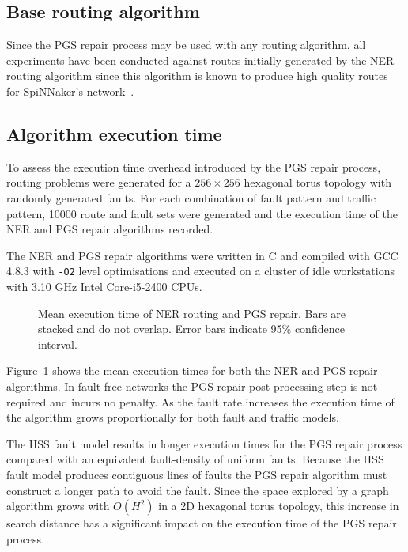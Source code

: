 		\subsection{Base routing algorithm}
			
			Since the PGS repair process may be used with any routing algorithm, all
			experiments have been conducted against routes initially generated by the
			NER routing algorithm since this algorithm is known to produce high
			quality routes for SpiNNaker's network~\cite{navaridas14}.
			
		\subsection{Algorithm execution time}
			
			To assess the execution time overhead introduced by the PGS repair
			process, routing problems were generated for a $256\times256$ hexagonal
			torus topology with randomly generated faults. For each combination of
			fault pattern and traffic pattern, \num{10000} route and fault sets were
			generated and the execution time of the NER and PGS repair algorithms
			recorded.
			
			The NER and PGS repair algorithms were written in C and compiled with GCC
			4.8.3 with \verb|-O2| level optimisations and executed on a cluster of
			idle workstations with 3.10 GHz Intel Core-i5-2400 CPUs.
			
			\begin{figure}
				\center
				
				\caption[Mean execution time of NER routing and PGS repair.]%
				{Mean execution time of NER routing and PGS repair. Bars are stacked
				and do not overlap. Error bars indicate 95\% confidence interval.}
				\label{fig:routing-runtimes}
			\end{figure}
			
			Figure~\ref{fig:routing-runtimes} shows the mean execution times for both
			the NER and PGS repair algorithms. In fault-free networks the PGS repair
			post-processing step is not required and incurs no penalty. As the fault
			rate increases the execution time of the algorithm grows proportionally
			for both fault and traffic models.
			
			The HSS fault model results in longer execution times for the PGS repair
			process compared with an equivalent fault-density of uniform faults.
			Because the HSS fault model produces contiguous lines of faults the PGS
			repair algorithm must construct a longer path to avoid the fault.  Since
			the space explored by a graph algorithm grows with $O(H^2)$ in a 2D
			hexagonal torus topology, this increase in search distance has a
			significant impact on the execution time of the PGS repair process.
			
